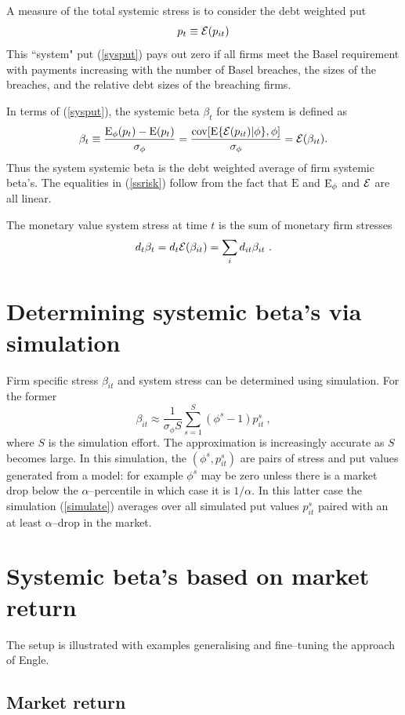 \documentclass[authoryear]{elsarticle}
\newcommand{\E}{\mathrm{E}}
\newcommand{\cov}{\mathrm{cov}}
\newcommand{\Ex}{{\cal E}}
\newcommand{\eref}[1]{(\ref{#1})}
\newcommand{\be}[1]{\begin{equation}\label{#1}}
\newcommand{\ee}{\end{equation}}
\begin{document}
A measure of the total systemic stress is to consider the debt weighted put 
\be{sysput}
p_t\equiv\Ex(p_{it})
\ee
This ``system" put \eref{sysput} pays out zero if all firms meet the Basel requirement with payments increasing with the number of Basel breaches, the sizes of the breaches, and the relative debt sizes of the breaching firms.  

In terms of \eref{sysput}, the  systemic beta $\beta_t$ for the system is defined as
\be{ssrisk}
 \beta_t\equiv\frac{\Es(p_{t}) -\E(p_{t})}{\sigma_\phi} = \frac{\cov[\E\{\Ex(p_{it})|\phi\},\phi]}{\sigma_\phi}=\Ex(\beta_{it}) .
\ee
Thus the system systemic beta is the debt weighted average of firm systemic beta's.  The equalities in \eref{ssrisk} follow from the fact that  $\E$ and $\Es$ and $\Ex$ are all linear.

The monetary value  system stress at time $t$ is the sum of monetary firm stresses
$$
d_t\beta_t = d_t\Ex(\beta_{it}) = \sum_i d_{it}\beta_{it}\ . 
$$


\section{Determining systemic beta's via simulation}

Firm specific stress $\beta_{it}$ and system stress  can be determined using simulation.   For the former
\be{simulate}
\beta_{it} \approx \frac{1}{\sigma_\phi S}\sum_{s=1}^S (\phi^s-1)p_{it}^s\ ,
\ee
where $S$ is the simulation effort.  The approximation is increasingly accurate as $S$ becomes large.  In this simulation, the $(\phi^s,p_{it}^s)$ are pairs of stress and put values generated from a model: for example $\phi^s$ may be zero unless there is a market drop below the $\alpha$--percentile in which case it is $1/\alpha$.   In this latter case the simulation \eref{simulate} averages over all simulated put values $p_{it}^s$ paired with an at least $\alpha$--drop in the market.





\section{Systemic beta's based on  market return}
The setup is illustrated with  examples generalising and fine--tuning the approach of Engle.

\subsection{Market return}
\end{document}
